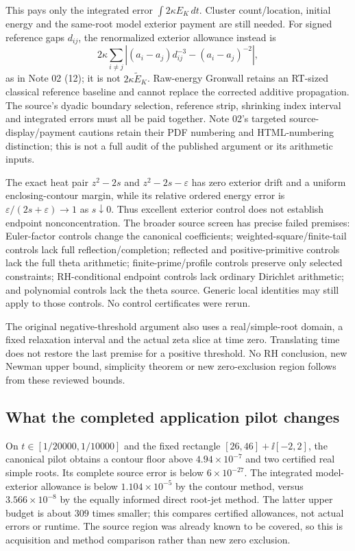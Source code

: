 This pays only the integrated error $\int2\kappa E_K\,dt$.
Cluster count/location, initial energy and the same-root model exterior
payment are still needed. For signed reference gaps $d_{ij}$, the
renormalized exterior allowance instead is
\[
 2\kappa\sum_{i\ne j}
       |(a_i-a_j)d_{ij}^{-3}-(a_i-a_j)^{-2}|,
\]
as in Note 02 (12); it is not $2\kappa\widetilde E_K$.
Raw-energy Gronwall retains an RT-sized classical reference baseline
and cannot replace the corrected additive propagation. The source's
dyadic boundary selection, reference strip, shrinking index interval
and integrated errors must all be paid together. Note 02's targeted
source-display/payment cautions retain their PDF numbering and
HTML-numbering distinction; this is not a full audit of the published
argument or its arithmetic inputs.

The exact heat pair $z^2-2s$ and $z^2-2s-\varepsilon$ has zero exterior
drift and a uniform enclosing-contour margin, while its relative ordered
energy error is $\varepsilon/(2s+\varepsilon)\to1$ as $s\downarrow0$.
Thus excellent exterior control does not establish endpoint
nonconcentration. The broader source screen has precise failed premises:
Euler-factor controls change the canonical coefficients;
weighted-square/finite-tail controls lack full reflection/completion;
reflected and positive-primitive controls lack the full theta arithmetic;
finite-prime/profile controls preserve only selected constraints;
RH-conditional endpoint controls lack ordinary Dirichlet arithmetic;
and polynomial controls lack the theta source. Generic local identities
may still apply to those controls. No control certificates were rerun.

The original negative-threshold argument also uses a real/simple-root
domain, a fixed relaxation interval and the actual zeta slice at time
zero. Translating time does not restore the last premise for a positive
threshold. No RH conclusion, new Newman upper bound, simplicity theorem
or new zero-exclusion region follows from these reviewed bounds.

\subsection{What the completed application pilot changes}
On $t\in[1/20000,1/10000]$ and the fixed rectangle
$[26,46]+\ii[-2,2]$, the canonical pilot obtains a contour floor above
$4.94\times10^{-7}$ and two certified real simple roots. Its complete
source error is below $6\times10^{-27}$. The integrated model-exterior
allowance is below $1.104\times10^{-5}$ by the contour method, versus
$3.566\times10^{-8}$ by the equally informed direct root-jet method.
The latter upper budget is about $309$ times smaller; this compares
certified allowances, not actual errors or runtime. The source region
was already known to be covered, so this is acquisition and method
comparison rather than new zero exclusion.

